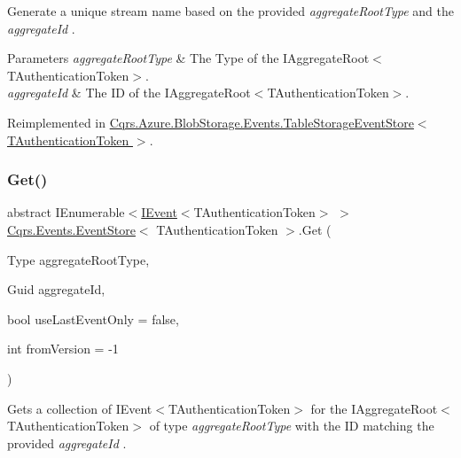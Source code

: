 Generate a unique stream name based on the provided {\itshape aggregate\+Root\+Type}  and the {\itshape aggregate\+Id} . 


\begin{DoxyParams}{Parameters}
{\em aggregate\+Root\+Type} & The Type of the I\+Aggregate\+Root$<$\+T\+Authentication\+Token$>$.\\
\hline
{\em aggregate\+Id} & The ID of the I\+Aggregate\+Root$<$\+T\+Authentication\+Token$>$.\\
\hline
\end{DoxyParams}


Reimplemented in \hyperlink{classCqrs_1_1Azure_1_1BlobStorage_1_1Events_1_1TableStorageEventStore_a5cee1f388c1a03d9cfea5ee1a9f42657_a5cee1f388c1a03d9cfea5ee1a9f42657}{Cqrs.\+Azure.\+Blob\+Storage.\+Events.\+Table\+Storage\+Event\+Store$<$ T\+Authentication\+Token $>$}.

\mbox{\label{classCqrs_1_1Events_1_1EventStore_aa1d0d399a35c1e3b0759e27202695d8b_aa1d0d399a35c1e3b0759e27202695d8b}} 
\subsubsection{\texorpdfstring{Get()}{Get()}\hspace{0.1cm}{\footnotesize\ttfamily [1/2]}}
{\footnotesize\ttfamily abstract I\+Enumerable$<$\hyperlink{interfaceCqrs_1_1Events_1_1IEvent}{I\+Event}$<$T\+Authentication\+Token$>$ $>$ \hyperlink{classCqrs_1_1Events_1_1EventStore}{Cqrs.\+Events.\+Event\+Store}$<$ T\+Authentication\+Token $>$.Get (\begin{DoxyParamCaption}\item[{Type}]{aggregate\+Root\+Type,  }\item[{Guid}]{aggregate\+Id,  }\item[{bool}]{use\+Last\+Event\+Only = {\ttfamily false},  }\item[{int}]{from\+Version = {\ttfamily -\/1} }\end{DoxyParamCaption})\hspace{0.3cm}{\ttfamily [pure virtual]}}



Gets a collection of I\+Event$<$\+T\+Authentication\+Token$>$ for the I\+Aggregate\+Root$<$\+T\+Authentication\+Token$>$ of type {\itshape aggregate\+Root\+Type}  with the ID matching the provided {\itshape aggregate\+Id} . 


